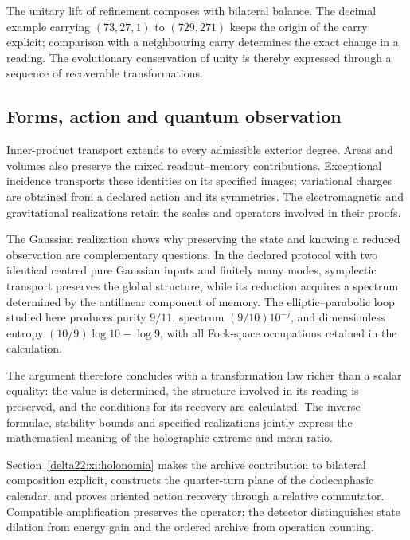 The unitary lift of refinement composes with bilateral balance. The decimal example carrying \((73,27,1)\) to \((729,271)\) keeps the origin of the carry explicit; comparison with a neighbouring carry determines the exact change in a reading. The evolutionary conservation of unity is thereby expressed through a sequence of recoverable transformations.



\subsection*{Forms, action and quantum observation}
Inner-product transport extends to every admissible exterior degree. Areas and volumes also preserve the mixed readout--memory contributions. Exceptional incidence transports these identities on its specified images; variational charges are obtained from a declared action and its symmetries. The electromagnetic and gravitational realizations retain the scales and operators involved in their proofs.

The Gaussian realization shows why preserving the state and knowing a reduced observation are complementary questions. In the declared protocol with two identical centred pure Gaussian inputs and finitely many modes, symplectic transport preserves the global structure, while its reduction acquires a spectrum determined by the antilinear component of memory. The elliptic--parabolic loop studied here produces purity \(9/11\), spectrum \((9/10)10^{-j}\), and dimensionless entropy \((10/9)\log10-\log9\), with all Fock-space occupations retained in the calculation.

The argument therefore concludes with a transformation law richer than a scalar equality: the value is determined, the structure involved in its reading is preserved, and the conditions for its recovery are calculated. The inverse formulae, stability bounds and specified realizations jointly express the mathematical meaning of the holographic extreme and mean ratio.

\par
Section~\ref{delta22:xi:holonomia} makes the archive contribution to bilateral composition explicit, constructs the quarter-turn plane of the dodecaphasic calendar, and proves oriented action recovery through a relative commutator. Compatible amplification preserves the operator; the detector distinguishes state dilation from energy gain and the ordered archive from operation counting.
